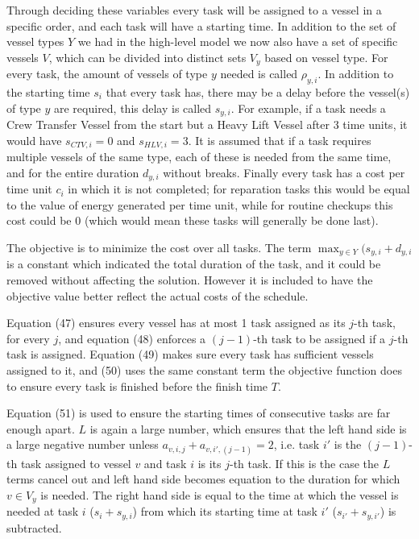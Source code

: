 \documentclass[a4paper,12pt]{article}
\begin{document}
Through deciding these variables every task will be assigned to a vessel in a specific order, and each task will have a starting time. In addition to the set of vessel types $Y$ we had in the high-level model we now also have a set of specific vessels $V$, which can be divided into distinct sets $V_y$ based on vessel type. For every task, the amount of vessels of type $y$ needed is called $\rho_{y,i}$. In addition to the starting time $s_i$ that every task has, there may be a delay before the vessel(s) of type $y$ are required, this delay is called $s_{y,i}$. For example, if a task needs a Crew Transfer Vessel from the start but a Heavy Lift Vessel after 3 time units, it would have $s_{CTV,i} = 0$ and $ s_{HLV,i} = 3$. It is assumed that if a task requires multiple vessels of the same type, each of these is needed from the same time, and for the entire duration $d_{y,i}$ without breaks. Finally every task has a cost per time unit $c_i$ in which it is not completed; for reparation tasks this would be equal to the value of energy generated per time unit, while for routine checkups this cost could be 0 (which would mean these tasks will generally be done last). 

The objective is to minimize the cost over all tasks. The term $\max_{y \in Y} (s_{y,i}+ d_{y,i}$ is a constant which indicated the total duration of the task, and it could be removed without affecting the solution. However it is included to have the objective value better reflect the actual costs of the schedule. 

Equation (47) ensures every vessel has at most 1 task assigned as its $j$-th task, for every $j$, and equation (48) enforces a $(j-1)$-th task to be assigned if a $j$-th task is assigned. Equation (49) makes sure every task has sufficient vessels assigned to it, and (50) uses the same constant term the objective function does to ensure every task is finished before the finish time $T$. 

Equation (51) is used to ensure the starting times of consecutive tasks are far enough apart. $L$ is again a large number, which ensures that the left hand side is a large negative number unless  $a_{v,i,j} + a_{v,i',(j-1)} = 2$, i.e. task $i'$ is the $(j-1)$-th task assigned to vessel $v$ and task $i$ is its $j$-th task. If this is the case the $L$ terms cancel out and left hand side becomes equation to the duration for which $v \in V_y$ is needed. The right hand side is equal to the time at which the vessel is needed at task $i$ ($s_i + s_{y,i}$) from which its starting time at task $i'$ ($s_{i'} + s_{y,i'}$) is subtracted. 
\end{document}
